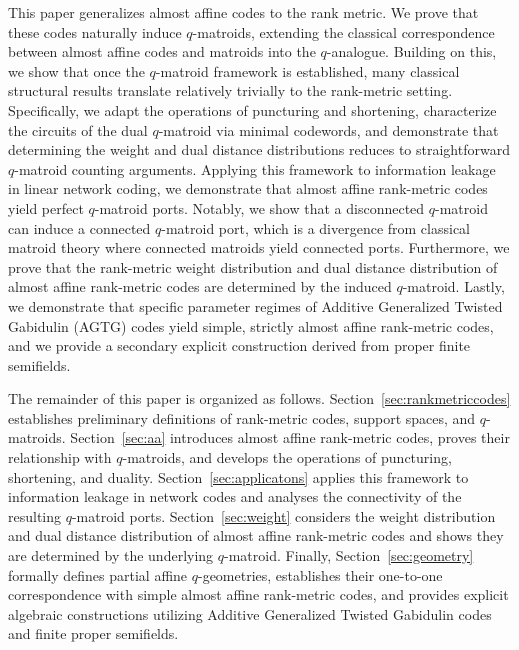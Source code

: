 \documentclass[a4paper,11pt,reqno]{article}
\theoremstyle{plain} \numberwithin{equation}{section}
\theoremstyle{definition}
\begin{document}
This paper generalizes almost affine codes to the rank metric. We prove that these codes naturally induce $q$-matroids, extending the classical correspondence between almost affine codes and matroids into the $q$-analogue. Building on this, we show that once the $q$-matroid framework is established, many classical structural results translate relatively trivially to the rank-metric setting. Specifically, we adapt the operations of puncturing and shortening, characterize the circuits of the dual $q$-matroid via minimal codewords, and demonstrate that determining the weight and dual distance distributions reduces to straightforward $q$-matroid counting arguments. Applying this framework to information leakage in linear network coding, we demonstrate that almost affine rank-metric codes yield perfect $q$-matroid ports. Notably, we show that a disconnected $q$-matroid can induce a connected $q$-matroid port, which is a divergence from classical matroid theory where connected matroids yield connected ports. Furthermore, we prove that the rank-metric weight distribution and dual distance distribution of almost affine rank-metric codes are determined by the induced $q$-matroid. Lastly, we demonstrate that specific parameter regimes of Additive Generalized Twisted Gabidulin (AGTG) codes yield simple, strictly almost affine rank-metric codes, and we provide a secondary explicit construction derived from proper finite semifields.

The remainder of this paper is organized as follows. Section~\ref{sec:rankmetriccodes} establishes preliminary definitions of rank-metric codes, support spaces, and $q$-matroids. Section~\ref{sec:aa} introduces almost affine rank-metric codes, proves their relationship with $q$-matroids, and develops the operations of puncturing, shortening, and duality. Section~\ref{sec:applicatons} applies this framework to information leakage in network codes and analyses the connectivity of the resulting $q$-matroid ports. Section~\ref{sec:weight} considers the weight distribution and dual distance distribution of almost affine rank-metric codes and shows they are determined by the underlying $q$-matroid. Finally, Section~\ref{sec:geometry} formally defines partial affine $q$-geometries, establishes their one-to-one correspondence with simple almost affine rank-metric codes, and provides explicit algebraic constructions utilizing Additive Generalized Twisted Gabidulin codes and finite proper semifields.
\end{document}
